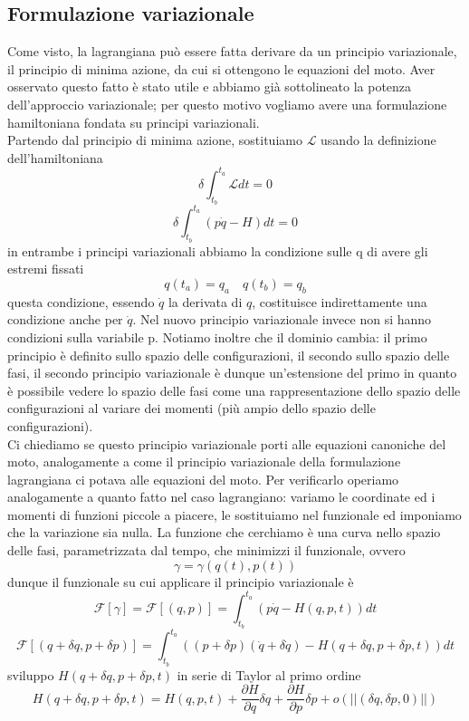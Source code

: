\documentclass[
10pt, %
a4paper, %
oneside, %
headinclude,footinclude, %
BCOR5mm, %
]{scrartcl}
\begin{document}
\subsection{Formulazione variazionale}
Come visto, la lagrangiana può essere fatta derivare da un principio variazionale, il principio di minima azione, da cui si ottengono le equazioni del moto. Aver osservato questo fatto è stato utile e abbiamo già sottolineato la potenza dell'approccio variazionale; per questo motivo vogliamo avere una formulazione hamiltoniana fondata su principi variazionali.\\
Partendo dal principio di minima azione,  sostituiamo \(\mathcal{L}\) usando la definizione dell'hamiltoniana
\[\delta\int^{t_a}_{t_b}\mathcal{L}dt = 0\]
\[\delta\int^{t_a}_{t_b}(p\dot{q}-H)dt = 0\]
in entrambe i principi variazionali abbiamo la condizione sulle q di avere gli estremi fissati
\[q(t_a) = q_a\quad q(t_b) = q_b \]
questa condizione, essendo $\dot{q}$ la derivata di \(q\), costituisce indirettamente una condizione anche per $\dot{q}$. Nel nuovo principio variazionale invece non si hanno condizioni sulla variabile p. Notiamo inoltre che il dominio cambia: il primo principio è definito sullo spazio delle configurazioni, il secondo sullo spazio delle fasi, il secondo principio variazionale è dunque un'estensione del primo in quanto è possibile vedere lo spazio delle fasi come una rappresentazione dello spazio delle configurazioni al variare dei momenti (più ampio dello spazio delle configurazioni).\\
Ci chiediamo se questo principio variazionale porti alle equazioni canoniche del moto, analogamente a come il principio variazionale della formulazione lagrangiana ci potava alle equazioni del moto. Per verificarlo operiamo analogamente a quanto fatto nel caso lagrangiano: variamo le coordinate ed i momenti di funzioni piccole a piacere, le sostituiamo nel funzionale ed imponiamo che la variazione sia nulla. La funzione che cerchiamo è una curva nello spazio delle fasi, parametrizzata dal tempo, che minimizzi il funzionale, ovvero
\[\gamma = \gamma(q(t), p(t))\]
dunque il funzionale su cui applicare il principio variazionale è
\[\mathcal{F}[\gamma] = \mathcal{F}[(q, p)] = \int^{t_a}_{t_b}(p\dot{q}-H(q, p, t))dt\]
\[\mathcal{F}[(q+\delta q, p+\delta p)] = \int^{t_a}_{t_b}((p+\delta p)(\dot{q}+\delta\dot{q})-H(q+\delta q, p+\delta p, t))dt\]
sviluppo \(H(q+\delta q, p+\delta p, t)\) in serie di Taylor al primo ordine
\[H(q+\delta q, p+\delta p, t) = H(q, p, t) + \frac{\partial H}{\partial q}\delta q + \frac{\partial H}{\partial p}\delta p+o\left(||(\delta q, \delta p, 0)||\right)\]
\end{document}
